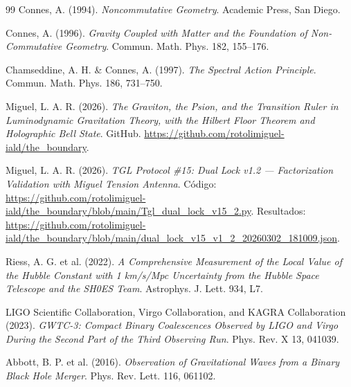 \documentclass[12pt,a4paper,twoside]{article}
\begin{document}
\begin{thebibliography}{99}
Connes, A. (1994).
\textit{Noncommutative Geometry}.
Academic Press, San Diego.

Connes, A. (1996).
\textit{Gravity Coupled with Matter and the Foundation of Non-Commutative Geometry}.
Commun. Math. Phys. 182, 155--176.

Chamseddine, A. H. \& Connes, A. (1997).
\textit{The Spectral Action Principle}.
Commun. Math. Phys. 186, 731--750.

Miguel, L. A. R. (2026).
\textit{The Graviton, the Psion, and the Transition Ruler in Luminodynamic Gravitation Theory, with the Hilbert Floor Theorem and Holographic Bell State}.
GitHub. \url{https://github.com/rotolimiguel-iald/the_boundary}.

Miguel, L. A. R. (2026).
\textit{TGL Protocol \#15: Dual Lock v1.2 --- Factorization Validation with Miguel Tension Antenna}.
Código: \url{https://github.com/rotolimiguel-iald/the_boundary/blob/main/Tgl_dual_lock_v15_2.py}.
Resultados: \url{https://github.com/rotolimiguel-iald/the_boundary/blob/main/dual_lock_v15_v1_2_20260302_181009.json}.

Riess, A. G. et al. (2022).
\textit{A Comprehensive Measurement of the Local Value of the Hubble Constant with 1 km/s/Mpc Uncertainty from the Hubble Space Telescope and the SH0ES Team}.
Astrophys. J. Lett. 934, L7.

LIGO Scientific Collaboration, Virgo Collaboration, and KAGRA Collaboration (2023).
\textit{GWTC-3: Compact Binary Coalescences Observed by LIGO and Virgo During the Second Part of the Third Observing Run}.
Phys. Rev. X 13, 041039.

Abbott, B. P. et al. (2016).
\textit{Observation of Gravitational Waves from a Binary Black Hole Merger}.
Phys. Rev. Lett. 116, 061102.

\end{thebibliography}
\end{document}
